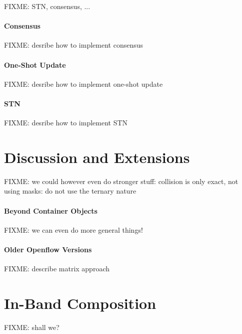 \documentclass[conference]{sigcomm-alternate}
\begin{document}
FIXME: STN, consensus, ...

\paragraph{Consensus} FIXME: desribe how to implement consensus

\paragraph{One-Shot Update} FIXME: desribe how to implement one-shot update

\paragraph{STN} FIXME: desribe how to implement STN

\section{Discussion and Extensions}\label{sec:discussion}

FIXME: we could however even do stronger stuff: collision is only exact, not using masks: do not use the ternary nature

\paragraph{Beyond Container Objects}
FIXME: we can even do more general things!

\paragraph{Older Openflow Versions} FIXME: describe matrix approach

\section{In-Band Composition}\label{sec:compo}

FIXME: shall we?
\end{document}
